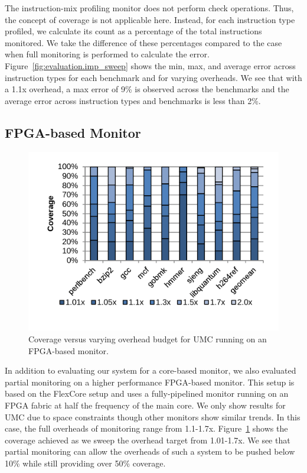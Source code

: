 The instruction-mix profiling monitor does not perform check operations. Thus,
the concept of coverage is not applicable here. Instead, for each instruction
type profiled, we calculate its count as a percentage of the total instructions
monitored. We take the difference of these percentages compared to the case
when full monitoring
is performed to calculate the error. Figure~\ref{fig:evaluation.imp_sweep}
shows the min, max, and average error across
instruction types for each benchmark and for varying overheads. We see that
with a 1.1x overhead, a max error of 9\% is observed across the benchmarks and the
average error across instruction types and benchmarks is less than 2\%. 

\subsection{FPGA-based Monitor}
\label{sec:evaluation.fpga}

\begin{figure}
  \begin{center}
    \vspace{-0.1in}
    \includegraphics[width=\linewidth, clip=true, trim=0 0.3in 0 0.1in]{figs/data_fpga_umc_sweep.pdf}
    \vspace{-0.2in}
    \caption{Coverage versus varying overhead budget for UMC running on an FPGA-based monitor.}
    \label{fig:evaluation.fpga_umc_sweep}
    \vspace{-0.1in}
  \end{center}
\end{figure}

In addition to evaluating our system for a core-based monitor, we also
evaluated partial monitoring on a higher performance FPGA-based monitor. This
setup is based on the FlexCore \cite{flexcore-micro10} setup and uses a
fully-pipelined monitor running on an FPGA fabric at half the frequency of the
main core. We only show results for UMC due to space constraints though other
monitors show similar trends. In this case, the full overheads of
monitoring range from 1.1-1.7x. Figure~\ref{fig:evaluation.fpga_umc_sweep} shows
the coverage achieved as we sweep the overhead target from 1.01-1.7x. We see that partial
monitoring can allow the overheads of such a system to be pushed below 10\%
while still providing over 50\% coverage.


